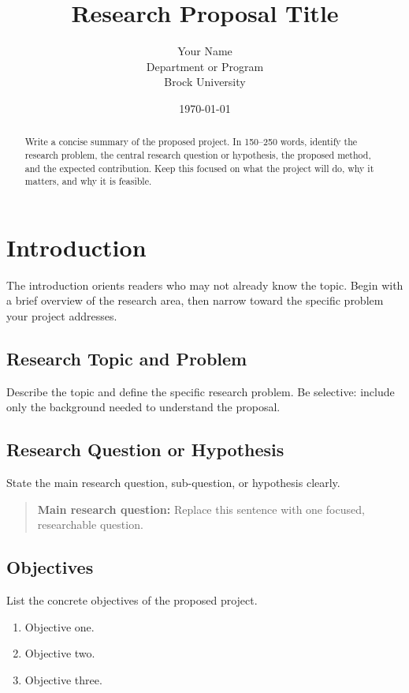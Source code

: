 \documentclass[12pt]{article}
\title{Research Proposal Title}
\author{Your Name\\Department or Program\\Brock University}
\date{\today}
\begin{document}
\maketitle

\begin{abstract}
Write a concise summary of the proposed project. In 150--250 words, identify
the research problem, the central research question or hypothesis, the proposed
method, and the expected contribution. Keep this focused on what the project
will do, why it matters, and why it is feasible.
\end{abstract}

\section{Introduction}

The introduction orients readers who may not already know the topic. Begin with
a brief overview of the research area, then narrow toward the specific problem
your project addresses.

\subsection{Research Topic and Problem}

Describe the topic and define the specific research problem. Be selective:
include only the background needed to understand the proposal.

\subsection{Research Question or Hypothesis}

State the main research question, sub-question, or hypothesis clearly.

\begin{quote}
\textbf{Main research question:} Replace this sentence with one focused,
researchable question.
\end{quote}

\subsection{Objectives}

List the concrete objectives of the proposed project.

\begin{enumerate}
  \item Objective one.
  \item Objective two.
  \item Objective three.
\end{enumerate}
\end{document}
